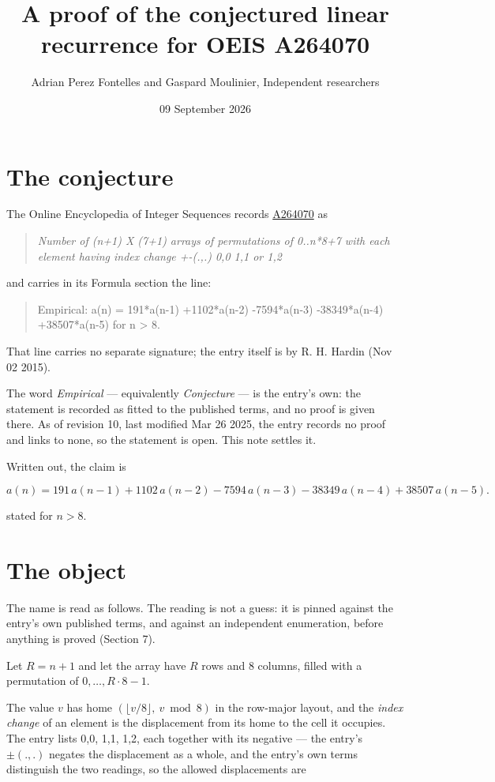 \documentclass[11pt]{article}
\title{A proof of the conjectured linear recurrence for OEIS A264070}
\author{Adrian Perez Fontelles and Gaspard Moulinier, Independent researchers}
\date{09 September 2026}
\theoremstyle{definition}
\begin{document}
\maketitle
\section{The conjecture}

The Online Encyclopedia of Integer Sequences records \href{https://oeis.org/A264070}{A264070} as

\begin{quote}\itshape Number of (n+1) X (7+1) arrays of permutations of 0..n*8+7 with each element having index change +-(.,.) 0,0 1,1 or 1,2\end{quote}

and carries in its Formula section the line:

\begin{quote}\ttfamily Empirical: a(n) = 191*a(n-1) +1102*a(n-2) -7594*a(n-3) -38349*a(n-4) +38507*a(n-5) for n > 8.\end{quote}

That line carries no separate signature; the entry itself is by R. H. Hardin (Nov 02 2015).

The word {\itshape Empirical} --- equivalently {\itshape Conjecture} --- is the entry's own: the statement is recorded as fitted to the published terms, and no proof is given there. As of revision 10, last modified Mar 26 2025, the entry records no proof and links to none, so the statement is open. This note settles it.

Written out, the claim is

\[a(n) = 191\,a(n-1) + 1102\,a(n-2) - 7594\,a(n-3) - 38349\,a(n-4) + 38507\,a(n-5).\]

stated for $n > 8$.

\section{The object}

The name is read as follows. The reading is not a guess: it is pinned against the entry's own published terms, and against an independent enumeration, before anything is proved (Section 7).

Let $R = n + 1$ and let the array have $R$ rows and $8$ columns, filled with a permutation of $0,\dots,R\cdot8-1$.

The value $v$ has home $(\lfloor v/8\rfloor,\ v \bmod 8)$ in the row-major layout, and the {\itshape index change} of an element is the displacement from its home to the cell it occupies. The entry lists 0,0, 1,1, 1,2, each together with its negative --- the entry's $\pm(.,.)$ negates the displacement as a whole, and the entry's own terms distinguish the two readings, so the allowed displacements are
\end{document}
